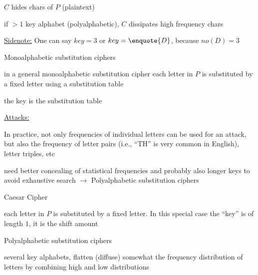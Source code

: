 \documentclass[landscape, a4paper]{article}
\begin{document}
\begin{minipage}[t]{0.19\pagewidth}
\begin{betterlist}
\begin{betterlist}
\begin{betterlist}
				\item $C$ hides chars of $P$ (plaintext)
				\item if $> 1$ key alphabet (polyalphabetic), $C$ dissipates high frequency chars
			\end{betterlist}
			\item \underline{Sidenote:} One can say $key = 3$ or $key = \enquote{D}$, because $no(D) = 3$
		\end{betterlist}
		\begin{betterlist}
			\item \alert{Monoalphabetic substitution ciphers}
			\begin{betterlist}
				\item in a general monoalphabetic substitution cipher each letter in $P$ is substituted by a fixed letter using a \alert{substitution table}
				\item the \alert{key} is the substitution table
				\item \underline{Attacks:}
				\begin{betterlist}
					\item In practice, not only frequencies of individual letters can be used for an attack, but also the frequency of letter pairs (i.e., \enquote{TH} is very common in English), letter triples, etc
					\item need better concealing of statistical frequencies and probably also longer keys to avoid exhaustive search $\rightarrow$ Polyalphabetic substitution ciphers
				\end{betterlist}
			\end{betterlist}
			\begin{betterlist}
				\item \alert{Caesar Cipher}
				\begin{betterlist}
					\item each letter in $P$ is substituted by a fixed letter. In this special case the \enquote{key} is of length $1$, it is the shift amount
				\end{betterlist}
			\end{betterlist}
		\end{betterlist}
		\begin{betterlist}
			\item \alert{Polyalphabetic substitution ciphers}
			\begin{betterlist}
				\item several key alphabets, flatten (diffuse) somewhat the frequency distribution of letters by combining high and low distributions

\end{betterlist}
\end{betterlist}
\end{betterlist}
\end{minipage}
\end{document}
